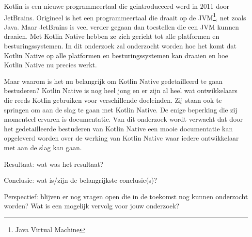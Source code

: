 Kotlin is een nieuwe programmeertaal die geintroduceerd werd in 2011 door JetBrains. Origineel is het een programmeertaal die draait op de JVM\footnote{Java Virtual Machine}, net zoals Java. Maar JetBrains is veel verder gegaan dan toestellen die een JVM kunnen draaien. Met Kotlin Native hebben ze zich gericht tot alle platformen en besturingssystemen. In dit onderzoek zal onderzocht worden hoe het komt dat Kotlin Native op alle platformen en besturingssystemen kan draaien en hoe Kotlin Native nu precies werkt. 

Maar waarom is het nu belangrijk om Kotlin Native gedetailleerd te gaan bestuderen? Kotlin Native is nog heel jong en er zijn al heel wat ontwikkelaars die reeds Kotlin gebruiken voor verschillende doeleinden. Zij staan ook te springen om aan de slag te gaan met Kotlin Native. De enige beperking die zij momenteel ervaren is documentatie. Van dit onderzoek wordt verwacht dat door het gedetailleerde bestuderen van Kotlin Native een mooie documentatie kan opgeleverd worden over de werking van Kotlin Native waar iedere ontwikkelaar met aan de slag kan gaan.

Resultaat: wat was het resultaat?

Conclusie: wat is/zijn de belangrijkste conclusie(s)?

Perspectief: blijven er nog vragen open die in de toekomst nog kunnen onderzocht worden? Wat is een mogelijk vervolg voor jouw onderzoek?
